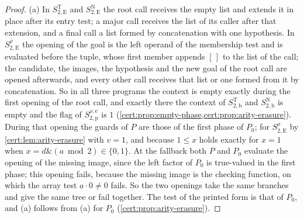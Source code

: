 \begin{proof}
(a) In $S^{\mathrm T}_{2,\mathrm E}$ and $S^{\mathrm N}_{2,\mathrm E}$ the root call
receives the empty list and extends it in place after its entry test; a major call
receives the list of its caller after that extension, and a final call a list
formed by concatenation with one hypothesis. In $S^{\rho}_{2,\mathrm E}$ the opening
of the goal is the left operand of the membership test and is evaluated before the
tuple, whose first member appends $[\,]$ to the list of the call; the candidate, the
images, the hypothesis and the new goal of the root call are opened afterwards, and
every other call receives that list or one formed from it by concatenation. So in
all three programs the context is empty exactly during the first opening of the
root call, and exactly there the context of $S^{\mathrm T}_{2,\mathrm b}$ and
$S^{\mathrm N}_{2,\mathrm b}$ is empty and the flag of
$S^{\rho,\mathrm e}_{2,\mathrm p}$ is $1$
(\cref{cert:prop:empty-phase,cert:prop:arity-erasure}). During that opening the
guards of $P$ are those of the first phase of $P_0$; for $S^{\rho}_{2,\mathrm E}$ by
\cref{cert:lem:arity-erasure} with $v=1$, and because $1\le x$ holds exactly for
$x=1$ when $x=d\mathbin{\&}(a\bmod 2)\in\{0,1\}$. At the fallback both $P$ and $P_0$
evaluate the opening of the missing image, since the left factor of $P_0$ is
true-valued in the first phase; this opening fails, because the missing image is
the checking function, on which the array test $a\cdot 0\neq 0$ fails. So the two
openings take the same branches and give the same tree or fail together. The test
of the printed form is that of $P_0$, and (a) follows from (a) for $P_0$
(\cref{cert:prop:arity-erasure}).


\end{proof}
